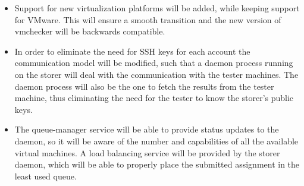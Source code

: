 \begin{itemize}
\item Support for new virtualization platforms will be added, while keeping support
for VMware. This will ensure a smooth transition and the new version of vmchecker
will be backwards compatible.
\item In order to eliminate the need for SSH keys for each account the communication
model will be modified, such that a daemon process running on the storer will
deal with the communication with the tester machines. The daemon process will also
be the one to fetch the results from the tester machine, thus eliminating the need
for the tester to know the storer's public keys.
\item The queue-manager service will be able to provide status updates to the daemon,
so it will be aware of the number and capabilities of all the available virtual
machines. A load balancing service will be provided by the storer daemon, which
will be able to properly place the submitted assignment in the least used queue.
\end{itemize}
